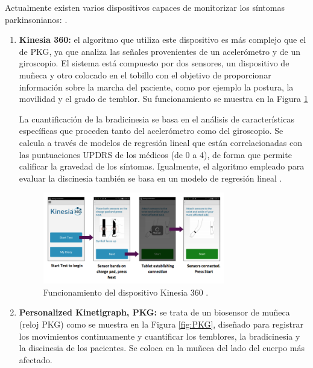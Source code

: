 Actualmente existen varios dispositivos capaces de monitorizar los síntomas parkinsonianos: \cite{rodriguez2022new}.

\begin{enumerate}
    \item \textbf{Kinesia 360:} el algoritmo que utiliza este dispositivo es más complejo que el de PKG, ya que analiza las señales provenientes de un acelerómetro y de un giroscopio. El sistema está compuesto por dos sensores, un dispositivo de muñeca y otro colocado en el tobillo con el objetivo de proporcionar información sobre la marcha del paciente, como por ejemplo la postura, la movilidad y el grado de temblor. Su funcionamiento se muestra en la Figura \ref{fig:kinesia360}
    
    La cuantificación de la bradicinesia se basa en el análisis de características específicas que proceden tanto del acelerómetro como del giroscopio. Se calcula a través de modelos de regresión lineal que están correlacionadas con las puntuaciones UPDRS de los médicos (de 0 a 4), de forma que permite calificar la gravedad de los síntomas. Igualmente, el algoritmo empleado para evaluar la discinesia también se basa en un modelo de regresión lineal \cite{heldman2012automated, piromalis2021commercially}.

    \begin{figure}[ht]
        \centering
        \includegraphics[width=0.75\textwidth]{img/kinesia360.png}
        \caption{Funcionamiento del dispositivo Kinesia 360 \cite{website:glneurotech}.}
        \label{fig:kinesia360}
    \end{figure}
    
    \item \textbf{Personalized Kinetigraph, PKG:} se trata de un biosensor de muñeca (reloj PKG) como se muestra en la Figura \ref{fig:PKG}, diseñado para registrar los movimientos continuamente y cuantificar los temblores, la bradicinesia y la discinesia de los pacientes. Se coloca en la muñeca del lado del cuerpo más afectado. 


\end{enumerate}
